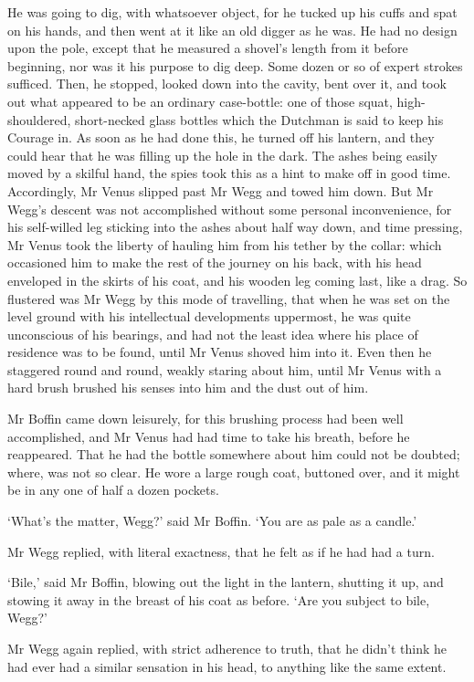 He was going to dig, with whatsoever object, for he tucked up his cuffs
and spat on his hands, and then went at it like an old digger as he
was. He had no design upon the pole, except that he measured a shovel’s
length from it before beginning, nor was it his purpose to dig deep.
Some dozen or so of expert strokes sufficed. Then, he stopped, looked
down into the cavity, bent over it, and took out what appeared to be an
ordinary case-bottle: one of those squat, high-shouldered, short-necked
glass bottles which the Dutchman is said to keep his Courage in. As soon
as he had done this, he turned off his lantern, and they could hear that
he was filling up the hole in the dark. The ashes being easily moved by
a skilful hand, the spies took this as a hint to make off in good time.
Accordingly, Mr Venus slipped past Mr Wegg and towed him down. But Mr
Wegg’s descent was not accomplished without some personal inconvenience,
for his self-willed leg sticking into the ashes about half way down, and
time pressing, Mr Venus took the liberty of hauling him from his tether
by the collar: which occasioned him to make the rest of the journey on
his back, with his head enveloped in the skirts of his coat, and his
wooden leg coming last, like a drag. So flustered was Mr Wegg by this
mode of travelling, that when he was set on the level ground with his
intellectual developments uppermost, he was quite unconscious of his
bearings, and had not the least idea where his place of residence was
to be found, until Mr Venus shoved him into it. Even then he staggered
round and round, weakly staring about him, until Mr Venus with a hard
brush brushed his senses into him and the dust out of him.

Mr Boffin came down leisurely, for this brushing process had been well
accomplished, and Mr Venus had had time to take his breath, before he
reappeared. That he had the bottle somewhere about him could not be
doubted; where, was not so clear. He wore a large rough coat, buttoned
over, and it might be in any one of half a dozen pockets.

‘What’s the matter, Wegg?’ said Mr Boffin. ‘You are as pale as a
candle.’

Mr Wegg replied, with literal exactness, that he felt as if he had had a
turn.

‘Bile,’ said Mr Boffin, blowing out the light in the lantern, shutting
it up, and stowing it away in the breast of his coat as before. ‘Are you
subject to bile, Wegg?’

Mr Wegg again replied, with strict adherence to truth, that he didn’t
think he had ever had a similar sensation in his head, to anything like
the same extent.


